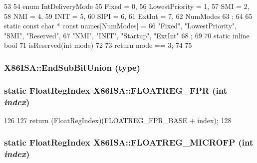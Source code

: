 \begin{DoxyCode}
53     {
54         enum IntDeliveryMode {
55             Fixed = 0,
56             LowestPriority = 1,
57             SMI = 2,
58             NMI = 4,
59             INIT = 5,
60             SIPI = 6,
61             ExtInt = 7,
62             NumModes
63         };
64 
65         static const char * const names[NumModes] = {
66             "Fixed", "LowestPriority", "SMI", "Reserved",
67             "NMI", "INIT", "Startup", "ExtInt"
68         };
69 
70         static inline bool
71         isReserved(int mode)
72         {
73             return mode == 3;
74         }
75     }
\end{DoxyCode}
\hypertarget{namespaceX86ISA_a976b8cb8bfaed626dd601febbf0c6fe8}{
\subsubsection[{EndSubBitUnion}]{\setlength{\rightskip}{0pt plus 5cm}X86ISA::EndSubBitUnion (type)}}
\label{namespaceX86ISA_a976b8cb8bfaed626dd601febbf0c6fe8}
\hypertarget{namespaceX86ISA_ab07809fafe3d56bd3789c7ada8139259}{
\subsubsection[{FLOATREG\_\-FPR}]{\setlength{\rightskip}{0pt plus 5cm}static {\bf FloatRegIndex} X86ISA::FLOATREG\_\-FPR (int {\em index})}}
\label{namespaceX86ISA_ab07809fafe3d56bd3789c7ada8139259}



\begin{DoxyCode}
126     {
127         return (FloatRegIndex)(FLOATREG_FPR_BASE + index);
128     }
\end{DoxyCode}
\hypertarget{namespaceX86ISA_af84bb6b9b85a3b7d663b92d1a968f81b}{
\subsubsection[{FLOATREG\_\-MICROFP}]{\setlength{\rightskip}{0pt plus 5cm}static {\bf FloatRegIndex} X86ISA::FLOATREG\_\-MICROFP (int {\em index})}}
\label{namespaceX86ISA_af84bb6b9b85a3b7d663b92d1a968f81b}



